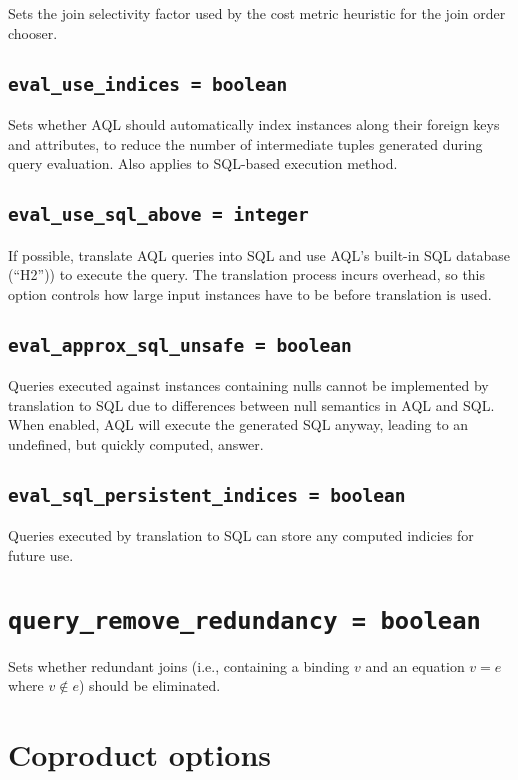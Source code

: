 \documentclass[10pt]{book}
\begin{document}
Sets the join selectivity factor used by the cost metric heuristic for the join order chooser.

\subsection{{\tt eval\_use\_indices = boolean}}
			
Sets whether AQL should automatically index instances along their foreign keys and attributes, to reduce the number of intermediate tuples generated during query evaluation.
Also applies to SQL-based execution method.

\subsection{{\tt eval\_use\_sql\_above = integer}}

If possible, translate AQL queries into SQL and use AQL's built-in SQL database (``H2'')) to execute the query.  The translation process incurs overhead, so this option controls how large input instances have to be before translation is used.

\subsection{{\tt eval\_approx\_sql\_unsafe = boolean}}

Queries executed against instances containing nulls cannot be implemented by translation to SQL due to differences between null semantics in AQL and SQL.  
When enabled, AQL will execute the generated SQL anyway, leading to an undefined, but quickly computed, answer.  

\subsection{{\tt eval\_sql\_persistent\_indices = boolean}}

Queries executed by translation to SQL can store any computed indicies for future use. 

\section{{\tt query\_remove\_redundancy = boolean}}

Sets whether redundant joins (i.e., containing a binding $v$ and an equation $v = e$ where $v \notin e$) should be eliminated.
\section{Coproduct options}
\end{document}
